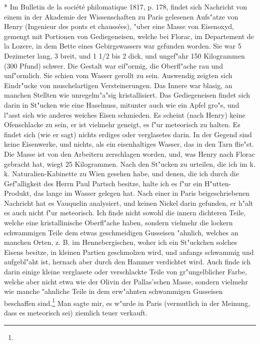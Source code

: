 \documentclass[a4paper, 11pt, oneside, polutonikogreek, german]{article}
\begin{document}
* Im Bulletin de la société philomatique 1817, p. 178, findet sich Nachricht von einem in der Akademie der Wissenschaften zu Paris gelesenen Aufs"atze von Henry (Ingenieur des ponts et chaussées), "uber eine Masse von Eisenoxyd, gemengt mit Portionen von Gediegeneisen, welche bei Florac, im Departement de la Lozere, in dem Bette eines Gebirgswassers war gefunden worden. Sie war 5 Dezimeter lang, 3 breit, und 1 1/2 bis 2 dick, und ungef"ahr 150 Kilogrammen (300 Pfund) schwer. Die Gestalt war eif"ormig, die Oberfl"ache rau und unf"ormlich. Sie schien vom Wasser gerollt zu sein. Auswendig zeigten sich Eindr"ucke von muschelartigen Versteinerungen. Das Innere war blasig, an manchen Stellten wie unregelm"a"sig kristallisiert. Das Gediegeneisen findet sich darin in St"ucken wie eine Haselnuss, mitunter auch wie ein Apfel gro"s, und l"asst sich wie anderes weiches Eisen schmieden. Es scheint (nach Henry) keine Ofenschlacke zu sein, er ist vielmehr geneigt, es f"ur meteorisch zu halten. Es findet sich (wie er sagt) nichts erdiges oder verglasetes darin. In der Gegend sind keine Eisenwerke, und nichts, als ein eisenhaltiges Wasser, das in den Tarn flie"st. Die Masse ist von den Arbeitern zerschlagen worden, und, was Henry nach Florac gebracht hat, wiegt 25 Kilogrammen. Nach den St"ucken zu urteilen, die ich im k. k. Naturalien-Kabinette zu Wien gesehen habe, und denen, die ich durch die Gef"alligkeit des Herrn Paul Partsch besitze, halte ich es f"ur ein H"utten-Produkt, das lange im Wasser gelegen hat. Nach einer in Paris beigeschriebenen Nachricht hat es Vauquelin analysiert, und keinen Nickel darin gefunden, er h"alt es auch nicht f"ur meteorisch. Ich finde nicht sowohl die innern dichteren Teile, welche eine kristallinische Oberfl"ache haben, sondern vielmehr die lockern schwammigen Teile dem etwas geschmeidigen Gusseisen "ahnlich, welches an manchen Orten, z. B. im Hennebergischen, woher ich ein St"uckchen solches Eisens besitze, in kleinen Partien geschmolzen wird, und anfangs schwammig und aufgebl"aht ist, hernach aber durch den Hammer verdichtet wird. Auch finde ich darin einige kleine verglasete oder verschlackte Teile von gr"ungelblicher Farbe, welche aber nicht etwa wie der Olivin der Pallas'schen Masse, sondern vielmehr wie manche "ahnliche Teile in dem erw"ahnten schwammigen Gusseisen beschaffen sind.\footnote{} Man sagte mir, es w"urde in Paris (vermutlich in der Meinung, dass es meteorisch sei) ziemlich teuer verkauft.
\end{document}

